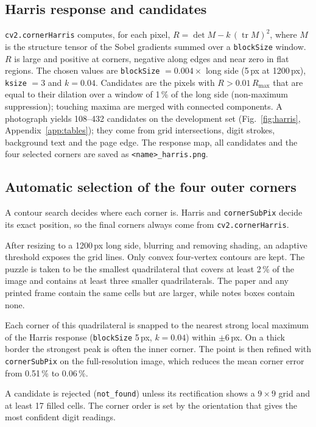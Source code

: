 \documentclass[conference]{IEEEtran}
\begin{document}
\subsection{Harris response and candidates}
\texttt{cv2.cornerHarris} computes, for each pixel, $R=\det M - k\,(\operatorname{tr} M)^2$, where $M$ is the structure tensor of the Sobel gradients summed over a \texttt{blockSize} window. $R$ is large and positive at corners, negative along edges and near zero in flat regions. The chosen values are \texttt{blockSize} $=0.004\times$ long side (5\,px at 1200\,px), \texttt{ksize} $=3$ and $k=0.04$. Candidates are the pixels with $R > 0.01\,R_{\max}$ that are equal to their dilation over a window of 1\,\% of the long side (non-maximum suppression); touching maxima are merged with connected components. A photograph yields 108--432 candidates on the development set (Fig.~\ref{fig:harris}, Appendix~\ref{app:tables}); they come from grid intersections, digit strokes, background text and the page edge. The response map, all candidates and the four selected corners are saved as \texttt{<name>\_harris.png}.



\subsection{Automatic selection of the four outer corners}
A contour search decides where each corner is. Harris and \texttt{cornerSubPix} decide its exact position, so the final corners always come from \texttt{cv2.cornerHarris}.

After resizing to a 1200\,px long side, blurring and removing shading, an adaptive threshold exposes the grid lines. Only convex four-vertex contours are kept. The puzzle is taken to be the smallest quadrilateral that covers at least 2\,\% of the image and contains at least three smaller quadrilaterals. The paper and any printed frame contain the same cells but are larger, while notes boxes contain none.

Each corner of this quadrilateral is snapped to the nearest strong local maximum of the Harris response (\texttt{blockSize} 5\,px, $k=0.04$) within $\pm6$\,px. On a thick border the strongest peak is often the inner corner. The point is then refined with \texttt{cornerSubPix} on the full-resolution image, which reduces the mean corner error from 0.51\,\% to 0.06\,\%.

A candidate is rejected (\texttt{not\_found}) unless its rectification shows a $9\times9$ grid and at least 17 filled cells. The corner order is set by the orientation that gives the most confident digit readings.
\end{document}

